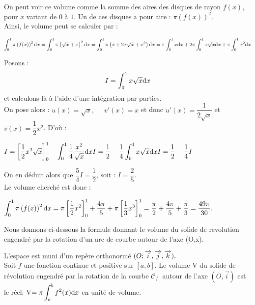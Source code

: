 On peut voir ce volume comme la somme des aires des disques de rayon $f(x)$, pour $x$ variant de $0$ à $1$. Un de ces disques a pour aire : $\pi\left(f(x)\right)^2$.\\
Ainsi, le volume peut se calculer par :

$
\displaystyle\int_{0}^{1}\pi\left(f(x)\right)^2{\rm d}x  = \displaystyle\int_{0}^{1}\pi\left(\sqrt{x}+x\right)^2{\rm d}x\\
 = \displaystyle\int_{0}^{1}\pi\left(x+2x\sqrt{x}+x^2\right){\rm d}x\\
 = \pi \displaystyle\int_{0}^{1} x{\rm d}x + 2\pi\displaystyle\int_{0}^{1}x\sqrt{x}{\rm d}x + \pi\displaystyle\int_{0}^{1}x^2{\rm d}x$


Posons :
\[ I =\displaystyle\int_{0}^{1}x\sqrt{x}{\rm d}x \]
et calculons-là à l'aide d'une intégration par parties.\\
On pose alors : $u(x)=\sqrt{x},\quad $ $v'(x)=x$ et donc $u'(x)=\dfrac{1}{2\sqrt{x}}$ et $v(x)=\dfrac{1}{2}x^2$. D'où :

$I  = \left[\dfrac{1}{2}x^2\sqrt{x}\right]_0^1-\displaystyle\int_{0}^{1}\dfrac{1}{4}\dfrac{x^2}{\sqrt{x}}{\rm d}x\\
I = \dfrac{1}{2}-\dfrac{1}{4}\displaystyle\int_{0}^{1}x\sqrt{x}{\rm d}x\\
I = \dfrac{1}{2}-\dfrac{1}{4}I$


On en déduit alors que $\dfrac{5}{4}I=\dfrac{1}{2}$, soit : $I=\dfrac{2}{5}.$\\
Le volume cherché est donc :

$\displaystyle\int_{0}^{1}\pi\left(f(x)\right)^2{\rm d}x  = \pi\left[\dfrac{1}{2}x^2\right]_0^1+\dfrac{4\pi}{5}+\pi\left[\dfrac{1}{3}x^3\right]_0^1
 = \dfrac{\pi}{2}+\dfrac{4\pi}{5}+\dfrac{\pi}{3}
 = \dfrac{49\pi}{30}.$


Nous donnons  ci-dessous la formule donnant le volume du solide  de revolution engendré par la rotation d'un arc de courbe autour de l'axe (O,x).

\begin{property}
 L'espace est muni d'un repère  orthonormé $ (O ;\overrightarrow{i},\overrightarrow{j}, \overrightarrow{k}). $\\
  Soit $f$ une fonction continue   et positive sur $[a, b]$. Le  volume  V du solide  de révolution engendré par la rotation de la courbe $ \mathcal{C}_{f}\; $    autour de l'axe $(O,\overrightarrow{i} ) $  est  le réel:\; V$ =\pi \displaystyle\int_{a}^{b}f^{2}(x){\rm d}x  $  en unité de volume.
  
 \end{property} 
 
